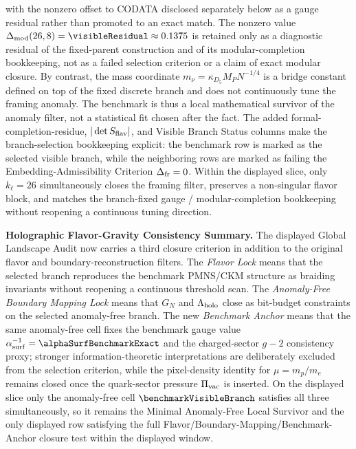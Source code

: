 \documentclass[11pt]{article}
\begin{document}
with the nonzero offset to CODATA disclosed separately below as a gauge residual rather than promoted to an exact match. The nonzero value $\Delta_{\rm mod}(26,8)=\visibleResidual\approx0.1375$ is retained only as a diagnostic residual of the fixed-parent construction and of its modular-completion bookkeeping, not as a failed selection criterion or a claim of exact modular closure. By contrast, the mass coordinate $m_\nu=\kappa_{D_5}M_PN^{-1/4}$ is a bridge constant defined on top of the fixed discrete branch and does not continuously tune the framing anomaly. The benchmark is thus a local mathematical survivor of the anomaly filter, not a statistical fit chosen after the fact. The added formal-completion-residue, $|\det S_{\rm flav}|$, and Visible Branch Status columns make the branch-selection bookkeeping explicit: the benchmark row is marked as the selected visible branch, while the neighboring rows are marked as failing the Embedding-Admissibility Criterion $\Delta_{\rm fr}=0$. Within the displayed slice, only $k_{\ell}=26$ simultaneously closes the framing filter, preserves a non-singular flavor block, and matches the branch-fixed gauge / modular-completion bookkeeping without reopening a continuous tuning direction.

\medskip
\noindent\textbf{Holographic Flavor-Gravity Consistency Summary.}
The displayed Global Landscape Audit now carries a third closure criterion in addition to the original flavor and boundary-reconstruction filters. The \emph{Flavor Lock} means that the selected branch reproduces the benchmark PMNS/CKM structure as braiding invariants without reopening a continuous threshold scan. The \emph{Anomaly-Free Boundary Mapping Lock} means that $G_N$ and $\Lambda_{\rm holo}$ close as bit-budget constraints on the selected anomaly-free branch. The new \emph{Benchmark Anchor} means that the same anomaly-free cell fixes the benchmark gauge value $\alpha^{-1}_{\rm surf}=\alphaSurfBenchmarkExact$ and the charged-sector $g-2$ consistency proxy; stronger information-theoretic interpretations are deliberately excluded from the selection criterion, while the pixel-density identity for $\mu=m_p/m_e$ remains closed once the quark-sector pressure $\Pi_{\rm vac}$ is inserted. On the displayed slice only the anomaly-free cell $\benchmarkVisibleBranch$ satisfies all three simultaneously, so it remains the Minimal Anomaly-Free Local Survivor and the only displayed row satisfying the full Flavor/Boundary-Mapping/Benchmark-Anchor closure test within the displayed window.
\end{document}
